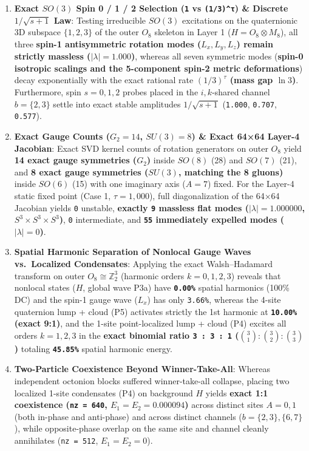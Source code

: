 \documentclass[
  a4paper,
]{article}
\providecommand{\tightlist}{%
  \setlength{\itemsep}{0pt}\setlength{\parskip}{0pt}}
\begin{document}
\begin{enumerate}
\def\labelenumi{\arabic{enumi}.}
\tightlist
\item
  \textbf{Exact \(SO(3)\) Spin 0 / 1 / 2 Selection (\texttt{1} vs
  \texttt{(1/3)\^{}τ}) \& Discrete \(1/\sqrt{s+1}\) Law}: Testing
  irreducible \(SO(3)\) excitations on the quaternionic 3D subspace
  \(\{1, 2, 3\}\) of the outer \(O_8\) skeleton in Layer 1
  (\(H = O_8 \otimes M_8\)), all three \textbf{spin-1 antisymmetric
  rotation modes (\(L_x, L_y, L_z\)) remain strictly massless
  (\(|\lambda| = 1.000\))}, whereas all seven symmetric modes
  (\textbf{spin-0 isotropic scalings and the 5-component spin-2 metric
  deformations}) decay exponentially with the exact rational rate
  \textbf{\((1/3)^\tau\) (mass gap \(\ln 3\))}. Furthermore, spin
  \(s = 0, 1, 2\) probes placed in the \(i, k\)-shared channel
  \(b = \{2, 3\}\) settle into exact stable amplitudes
  \textbf{\(1/\sqrt{s+1}\)} (\texttt{1.000}, \texttt{0.707},
  \texttt{0.577}).
\item
  \textbf{Exact Gauge Counts (\(G_2 = 14\), \(SU(3) = 8\)) \& Exact
  64×64 Layer-4 Jacobian}: Exact SVD kernel counts of rotation
  generators on outer \(O_8\) yield \textbf{14 exact gauge symmetries
  (\(G_2\))} inside \(SO(8)\) (28) and \(SO(7)\) (21), and \textbf{8
  exact gauge symmetries (\(SU(3)\), matching the 8 gluons)} inside
  \(SO(6)\) (15) with one imaginary axis (\(A=7\)) fixed. For the
  Layer-4 static fixed point (Case 1, \(\tau = 1,000\)), full
  diagonalization of the 64×64 Jacobian yields \texttt{0} unstable,
  \textbf{exactly \texttt{9} massless flat modes
  (\(|\lambda| = 1.000000\), \(S^3\times S^3\times S^3\))}, \texttt{0}
  intermediate, and \textbf{\texttt{55} immediately expelled modes
  (\(|\lambda| = 0\))}.
\item
  \textbf{Spatial Harmonic Separation of Nonlocal Gauge Waves
  vs.~Localized Condensates}: Applying the exact Walsh--Hadamard
  transform on outer \(O_8 \cong \mathbb{Z}_2^3\) (harmonic orders
  \(k = 0, 1, 2, 3\)) reveals that nonlocal states (\(H\), global wave
  P3a) have \textbf{\texttt{0.00\%}} spatial harmonics (100\% DC) and
  the spin-1 gauge wave (\(L_x\)) has only \texttt{3.66\%}, whereas the
  4-site quaternion lump + cloud (P5) activates strictly the 1st
  harmonic at \textbf{\texttt{10.00\%} (exact 9:1)}, and the 1-site
  point-localized lump + cloud (P4) excites all orders \(k = 1, 2, 3\)
  in the \textbf{exact binomial ratio \texttt{3\ :\ 3\ :\ 1}
  (\(\binom{3}{1}:\binom{3}{2}:\binom{3}{3}\))} totaling
  \textbf{\texttt{45.85\%}} spatial harmonic energy.
\item
  \textbf{Two-Particle Coexistence Beyond Winner-Take-All}: Whereas
  independent octonion blocks suffered winner-take-all collapse, placing
  two localized 1-site condensates (P4) on background \(H\) yields
  \textbf{exact 1:1 coexistence (\texttt{nz\ =\ 640},
  \(E_1 = E_2 = 0.000094\))} across distinct sites \(A = 0, 1\) (both
  in-phase and anti-phase) and across distinct channels
  (\(b=\{2,3\}, \{6,7\}\)), while opposite-phase overlap on the same
  site and channel cleanly annihilates (\texttt{nz\ =\ 512},
  \(E_1 = E_2 = 0\)).
\end{enumerate}
\end{document}
